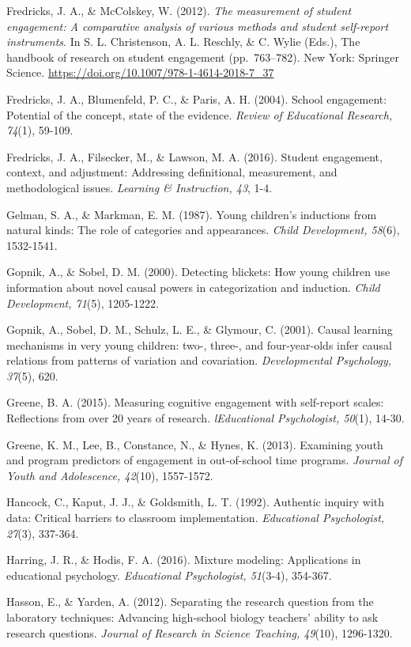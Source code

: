\documentclass[]{book}
\theoremstyle{definition}
\theoremstyle{definition}
\theoremstyle{definition}
\theoremstyle{remark}
\begin{document}
Fredricks, J. A., \& McColskey, W. (2012). \emph{The measurement of
student engagement: A comparative analysis of various methods and
student self-report instruments}. In S. L. Christenson, A. L. Reschly,
\& C. Wylie (Eds.), The handbook of research on student engagement
(pp.~763--782). New York: Springer Science.
\url{https://doi.org/10.1007/978-1-4614-2018-7_37}

Fredricks, J. A., Blumenfeld, P. C., \& Paris, A. H. (2004). School
engagement: Potential of the concept, state of the evidence.
\emph{Review of Educational Research, 74}(1), 59-109.

Fredricks, J. A., Filsecker, M., \& Lawson, M. A. (2016). Student
engagement, context, and adjustment: Addressing definitional,
measurement, and methodological issues. \emph{Learning \& Instruction,
43}, 1-4.

Gelman, S. A., \& Markman, E. M. (1987). Young children's inductions
from natural kinds: The role of categories and appearances. \emph{Child
Development, 58}(6), 1532-1541.

Gopnik, A., \& Sobel, D. M. (2000). Detecting blickets: How young
children use information about novel causal powers in categorization and
induction. \emph{Child Development, 71}(5), 1205-1222.

Gopnik, A., Sobel, D. M., Schulz, L. E., \& Glymour, C. (2001). Causal
learning mechanisms in very young children: two-, three-, and
four-year-olds infer causal relations from patterns of variation and
covariation. \emph{Developmental Psychology, 37}(5), 620.

Greene, B. A. (2015). Measuring cognitive engagement with self-report
scales: Reflections from over 20 years of research. \emph{lEducational
Psychologist, 50}(1), 14-30.

Greene, K. M., Lee, B., Constance, N., \& Hynes, K. (2013). Examining
youth and program predictors of engagement in out-of-school time
programs. \emph{Journal of Youth and Adolescence, 42}(10), 1557-1572.

Hancock, C., Kaput, J. J., \& Goldsmith, L. T. (1992). Authentic inquiry
with data: Critical barriers to classroom implementation.
\emph{Educational Psychologist, 27}(3), 337-364.

Harring, J. R., \& Hodis, F. A. (2016). Mixture modeling: Applications
in educational psychology. \emph{Educational Psychologist, 51}(3-4),
354-367.

Hasson, E., \& Yarden, A. (2012). Separating the research question from
the laboratory techniques: Advancing high‐school biology teachers'
ability to ask research questions. \emph{Journal of Research in Science
Teaching, 49}(10), 1296-1320.
\end{document}
